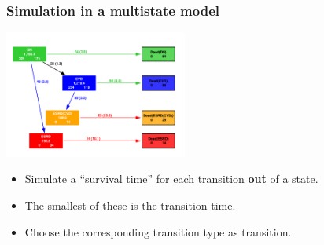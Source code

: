 


\begin{frame}
   \frametitle{Simulation in a multistate model}
\vspace*{-1ex}
\includegraphics[width=0.45\textwidth]{./GbAd-states.pdf}
\pause
\vspace*{-1ex}
   \begin{itemize}[<+->]
   \item Simulate a ``survival time'' for each transition
     \textbf{out} of a state.
   \item The smallest of these is the transition time.
   \item Choose the corresponding transition type as transition.
   \end{itemize}
\end{frame}

